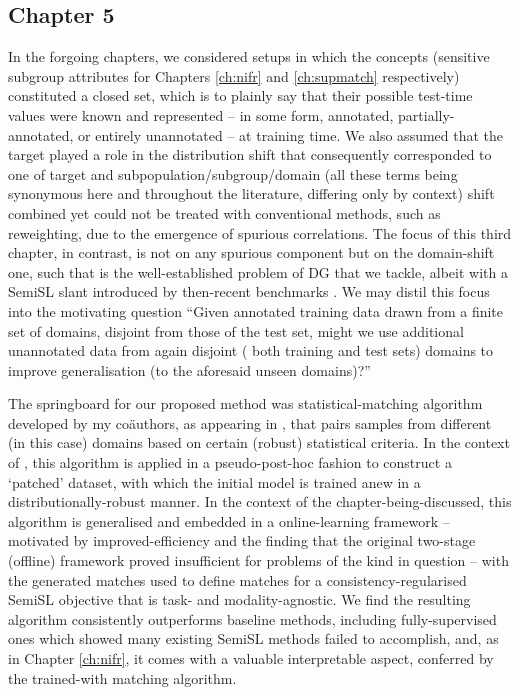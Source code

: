 \subsection*{Chapter 5}%
%
In the forgoing chapters, we considered setups in which the concepts (sensitive subgroup attributes
for Chapters \ref{ch:nifr} and \ref{ch:supmatch} respectively) constituted a closed set, which is
to plainly say that their possible test-time values were known and represented -- in some form,
annotated, partially-annotated, or entirely unannotated -- at training time.
%
We also assumed that the target played a role in the distribution shift that consequently
corresponded to one of target and subpopulation/subgroup/domain (all these terms being synonymous
here and throughout the literature, differing only by context) shift combined yet could not be
treated with conventional methods, such as reweighting, due to the emergence of spurious
correlations.
%
The focus of this third chapter, in contrast, is not on any spurious component but on the
domain-shift one, such that is the well-established problem of \ac{DG} that we tackle, albeit with
a \ac{SemiSL} slant introduced by then-recent benchmarks \citep{SagWeiLeeGaoetal22}. 
%
We may distil this focus into the motivating question ``Given annotated training data drawn from a
finite set of domains, disjoint from those of the test set, might we use additional unannotated
data from again disjoint (\wrt{} both training and test sets) domains to improve generalisation (to
the aforesaid unseen domains)?''
%

The springboard for our proposed method was statistical-matching algorithm developed by my
co{\"a}uthors, as appearing in \cite{RomInsShaQua22}, that pairs samples from different (in this
case) domains based on certain (robust) statistical criteria. 
%
In the context of \cite{RomInsShaQua22}, this algorithm is applied in a pseudo-post-hoc fashion to
construct a `patched' dataset, with which the initial model is trained anew in a
distributionally-robust manner.
%
In the context of the chapter-being-discussed, this algorithm is generalised and embedded in a
online-learning framework -- motivated by improved-efficiency and the finding that the original
two-stage (offline) framework proved insufficient for problems of the kind in question -- with the
generated matches used to define matches for a consistency-regularised \ac{SemiSL} objective that
is task- and modality-agnostic.
%
We find the resulting algorithm consistently outperforms baseline methods, including
fully-supervised ones which \citet{SagWeiLeeGaoetal22} showed many existing \ac{SemiSL} methods
failed to accomplish, and, as in Chapter \ref{ch:nifr}, it comes with a valuable interpretable
aspect, conferred by the trained-with matching algorithm.

